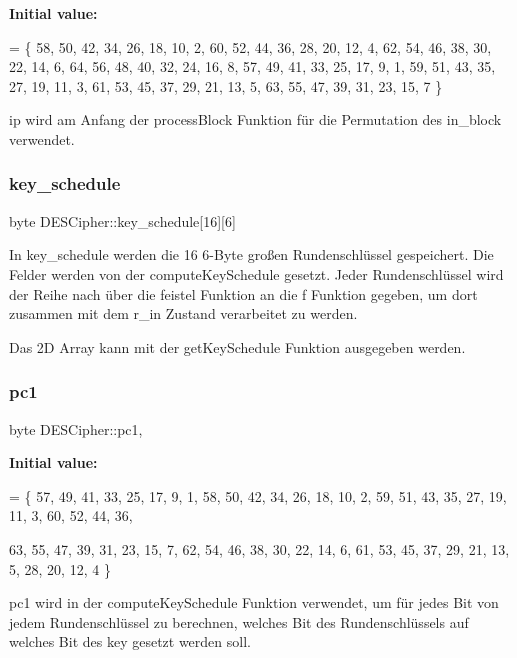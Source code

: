 {\bfseries Initial value\+:}
\begin{DoxyCode}
= \{
        58, 50, 42, 34, 26, 18, 10, 2,
        60, 52, 44, 36, 28, 20, 12, 4,
        62, 54, 46, 38, 30, 22, 14, 6,
        64, 56, 48, 40, 32, 24, 16, 8,
        57, 49, 41, 33, 25, 17, 9, 1,
        59, 51, 43, 35, 27, 19, 11, 3,
        61, 53, 45, 37, 29, 21, 13, 5,
        63, 55, 47, 39, 31, 23, 15, 7
\}
\end{DoxyCode}
ip wird am Anfang der process\+Block Funktion für die Permutation des in\+\_\+block verwendet. \mbox{\label{classDESCipher_a15e4c952af35d6b2d19655422b63a54e}} 
\subsubsection{\texorpdfstring{key\+\_\+schedule}{key\_schedule}}
{\footnotesize\ttfamily byte D\+E\+S\+Cipher\+::key\+\_\+schedule\mbox{[}16\mbox{]}\mbox{[}6\mbox{]}\hspace{0.3cm}{\ttfamily [private]}}

In key\+\_\+schedule werden die 16 6-\/\+Byte großen Rundenschlüssel gespeichert. Die Felder werden von der compute\+Key\+Schedule gesetzt. Jeder Rundenschlüssel wird der Reihe nach über die feistel Funktion an die f Funktion gegeben, um dort zusammen mit dem r\+\_\+in Zustand verarbeitet zu werden.

Das 2D Array kann mit der get\+Key\+Schedule Funktion ausgegeben werden. \mbox{\label{classDESCipher_acde876e8b143237759022dd47f867945}} 
\subsubsection{\texorpdfstring{pc1}{pc1}}
{\footnotesize\ttfamily byte D\+E\+S\+Cipher\+::pc1\hspace{0.3cm}{\ttfamily [static]}, {\ttfamily [private]}}

{\bfseries Initial value\+:}
\begin{DoxyCode}
= \{
        57, 49, 41, 33, 25, 17, 9,
        1, 58, 50, 42, 34, 26, 18,
        10, 2, 59, 51, 43, 35, 27,
        19, 11, 3, 60, 52, 44, 36,

        63, 55, 47, 39, 31, 23, 15,
        7, 62, 54, 46, 38, 30, 22,
        14, 6, 61, 53, 45, 37, 29,
        21, 13, 5, 28, 20, 12, 4
\}
\end{DoxyCode}
pc1 wird in der compute\+Key\+Schedule Funktion verwendet, um für jedes Bit von jedem Rundenschlüssel zu berechnen, welches Bit des Rundenschlüssels auf welches Bit des key gesetzt werden soll. \mbox{\label{classDESCipher_a16cb4a171e849e673cfaf3d864614e81}} 
